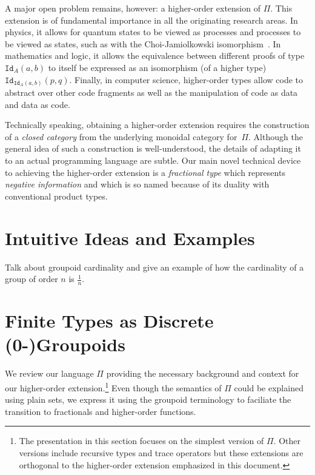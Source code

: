 \documentclass[11pt]{article}
\begin{document}
A major open problem remains, however: a higher-order extension of
$\Pi$. This extension is of fundamental importance in all the originating
research areas. In physics, it allows for quantum states to be viewed as
processes and processes to be viewed as states, such as with the
Choi-Jamiolkowski
isomorphism~\cite{choi1975completely,jamiolkowski1972linear}.  In mathematics
and logic, it allows the equivalence between different proofs of type
$\texttt{Id}_A(a,b)$ to itself be expressed as an isomorphism (of a higher
type) $\texttt{Id}_{\texttt{Id}_A(a,b)}(p,q)$. Finally, in computer science,
higher-order types allow code to abstract over other code fragments as well
as the manipulation of code as data and data as code.

Technically speaking, obtaining a higher-order extension requires the
construction of a \emph{closed category} from the underlying monoidal
category for~$\Pi$. Although the general idea of such a construction is
well-understood, the details of adapting it to an actual programming language
are subtle.  Our main novel technical device to achieving the higher-order
extension is a \emph{fractional type} which represents \emph{negative
information} and which is so named because of its duality with conventional
product types.

\section{Intuitive Ideas and Examples} 
\label{sec:intuition}

Talk about groupoid cardinality and give an example of how the cardinality of
a group of order $n$ is $\frac{1}{n}$.

\section{Finite Types as Discrete (0-)Groupoids} 

We review our language $\Pi$ providing the necessary background and context
for our higher-order extension.\footnote{The presentation in this section
  focuses on the simplest version of $\Pi$. Other versions include recursive
  types and trace operators but these extensions are orthogonal to the
  higher-order extension emphasized in this document.} Even though the
semantics of $\Pi$ could be explained using plain sets, we express it using
the groupoid terminology to faciliate the transition to fractionals and
higher-order functions. 
\end{document}

